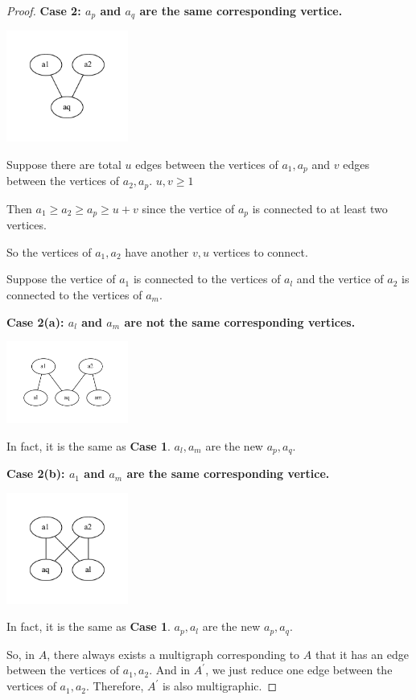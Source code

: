 \begin{proof}
\textbf{Case 2: $a_p$ and $a_q$ are the same corresponding vertice.}

\begin{center}
  \includegraphics[width=0.3\textwidth]{./figures/7-2-Case2.pdf}
\end{center}

Suppose there are total $u$ edges between the vertices of $a_1, a_p$ and $v$ edges between the vertices of $a_2,a_p$. $u,v \geq 1$

Then $a_1 \geq a_2 \geq a_p \geq u+v$ since the vertice of $a_p$ is connected to at least two vertices.

So the vertices of $a_1, a_2$ have another $v,u$ vertices to connect.

Suppose the vertice of $a_1$ is connected to the vertices of $a_l$ and the vertice of $a_2$ is connected to the vertices of $a_m$.

\textbf{Case 2(a): $a_l$ and $a_m$ are not the same corresponding vertices.}

\begin{center}
  \includegraphics[width=0.3\textwidth]{./figures/7-2-Case2a.pdf}
\end{center}

In fact, it is the same as \textbf{Case 1}. $a_l,a_m$ are the new $a_p, a_q$.

\textbf{Case 2(b): $a_1$ and $a_m$ are the same corresponding vertice.}

\begin{center}
  \includegraphics[width=0.3\textwidth]{./figures/7-2-Case2b.pdf}
\end{center}

In fact, it is the same as \textbf{Case 1}. $a_p,a_l$ are the new $a_p, a_q$.

So, in $A$, there always exists a multigraph corresponding to $A$ that it has an edge between the vertices of $a_1,a_2$. And in $A^\prime$, we just reduce one edge between the vertices of $a_1,a_2$. Therefore, $A^\prime$ is also multigraphic.

\end{proof}

